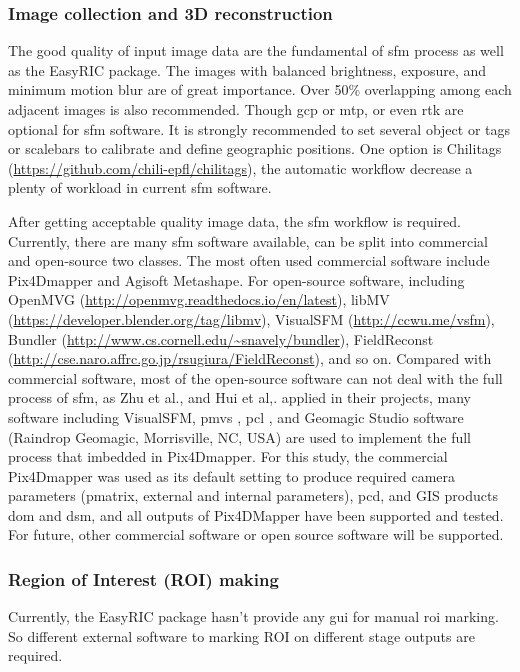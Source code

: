 \documentclass{configs/bmcart}
\begin{document}
\subsubsection*{Image collection and 3D reconstruction}
The good quality of input image data are the fundamental of \acrfull*{sfm} process as well as the EasyRIC package. The images with balanced brightness, exposure, and minimum motion blur are of great importance. Over 50\% overlapping among each adjacent images is also recommended. Though \acrfull*{gcp} or \acrfull*{mtp}, or even \acrfull*{rtk} are optional for \acrshort*{sfm} software. It is strongly recommended to set several object or tags or scalebars to calibrate and define geographic positions. One option is Chilitags (\url{https://github.com/chili-epfl/chilitags}), the automatic workflow decrease a plenty of workload in current \acrshort*{sfm} software.

After getting acceptable quality image data, the \acrshort*{sfm} workflow is required. Currently, there are many \acrshort*{sfm} software available, can be split into commercial and open-source two classes. The most often used commercial software include Pix4Dmapper and Agisoft Metashape. For open-source software, including OpenMVG (\url{http://openmvg.readthedocs.io/en/latest}), libMV (\url{https://developer.blender.org/tag/libmv}), VisualSFM (\url{http://ccwu.me/vsfm}), Bundler (\url{http://www.cs.cornell.edu/~snavely/bundler}), FieldReconst (\url{http://cse.naro.affrc.go.jp/rsugiura/FieldReconst}), and so on. Compared with commercial software, most of the open-source software can not deal with the full process of \acrshort*{sfm}, as Zhu et al., \cite{zhu_quantification_2020} and Hui et al,. \cite{hui_image-based_2018} applied in their projects, many software including VisualSFM, \acrfull*{pmvs} \cite{furukawa_accurate_2010}, \acrfull*{pcl} \cite{rusu_3d_2011}, and Geomagic Studio software (Raindrop Geomagic, Morrisville, NC, USA) are used to implement the full process that imbedded in Pix4Dmapper. For this study, the commercial Pix4Dmapper was used as its default setting to produce required camera parameters (pmatrix, external and internal parameters), \acrfull*{pcd}, and GIS products \acrfull*{dom} and \acrfull*{dsm}, and all outputs of Pix4DMapper have been supported and tested. For future, other commercial software or open source software will be supported.

\subsubsection*{Region of Interest (ROI) making}
Currently, the EasyRIC package hasn't provide any \acrfull*{gui} for manual \acrfull*{roi} marking. So different external software to marking ROI on different stage outputs are required.
\end{document}

